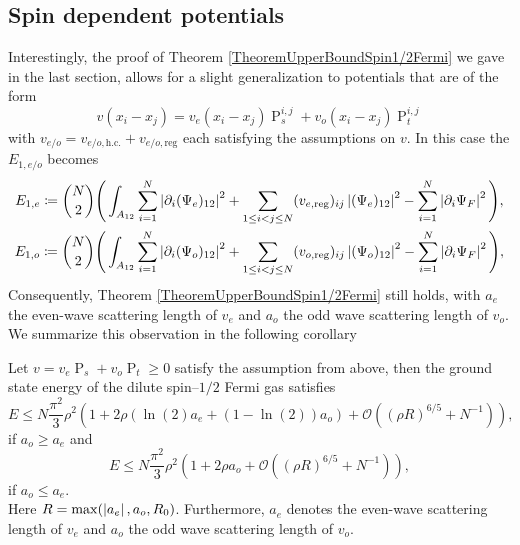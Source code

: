 \subsection{Spin dependent potentials}
Interestingly, the proof of Theorem \ref{TheoremUpperBoundSpin1/2Fermi} we gave in the last section, allows for a slight generalization to potentials that are of the form \begin{equation}
v(x_i-x_j)=v_e(x_i-x_j) \operatorname{P}^{i,j}_s+v_o(x_i-x_j)\operatorname{P}^{i,j}_t
\end{equation} 
with $  v_{e/o}=v_{e/o,\text{h.c.}}+v_{e/o,\text{reg}} $ each satisfying the assumptions on $ v $. In this case the $ E_{1,e/o} $ becomes
\begin{equation}
\begin{aligned}
E_{1,e}\coloneqq\binom{N}{2}\Bigg(\int_{A_{12}}\sum_{i=1}^{N}\left\lvert \partial_i(\Psi_e)_{12} \right\rvert^2
&+\sum_{1\leq i<j\leq N}(v_{e,\text{reg}})_{ij}\left\lvert (\Psi_e)_{12} \right\rvert^2-\sum_{i=1}^{N}\left\lvert \partial_i \Psi_F \right\rvert^2\Bigg),\\
E_{1,o}\coloneqq\binom{N}{2}\Bigg(\int_{A_{12}}\sum_{i=1}^{N}\left\lvert \partial_i(\Psi_o)_{12} \right\rvert^2
&+\sum_{1\leq i<j\leq N}(v_{o,\text{reg}})_{ij}\left\lvert (\Psi_o)_{12} \right\rvert^2-\sum_{i=1}^{N}\left\lvert \partial_i \Psi_F \right\rvert^2\Bigg),
\end{aligned}
\end{equation}
Consequently, Theorem \ref{TheoremUpperBoundSpin1/2Fermi} still holds, with $ a_e $ the even-wave scattering length of $ v_e $ and $ a_o $ the odd wave scattering length of $ v_o $. We summarize this observation in the following corollary
\begin{corollary}\label{CorollaryUpperBoundSpin1/2FermiSpinDependent}
	Let $ v=v_e\operatorname{P}_s+v_o\operatorname{P}_t\geq0 $ satisfy the assumption from above, then the ground state energy of the dilute spin--$ 1/2 $ Fermi gas satisfies\begin{equation}
	E\leq N\frac{\pi^2}{3}\rho^2\left(1+2\rho \left(\ln(2) a_e+(1-\ln(2))a_o\right)+\mathcal{O}\left((\rho R)^{6/5}+N^{-1}\right)\right),
	\end{equation}
	if $ a_o\geq a_e $ and 
	\begin{equation}
	E\leq N\frac{\pi^2}{3}\rho^2\left(1+2\rho a_o+\mathcal{O}\left((\rho R)^{6/5}+N^{-1}\right)\right),
	\end{equation}
	if $ a_o\leq a_e $.\\
	Here $ R=\max(\left\lvert a_e \right\rvert, a_o, R_0) $. Furthermore, $ a_e $ denotes the even-wave scattering length of $ v_e $ and $ a_o $ the odd wave scattering length of $ v_o $.
\end{corollary}
